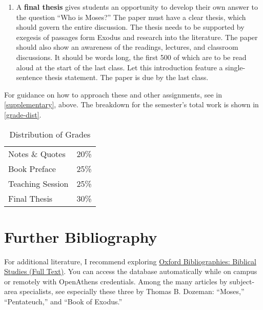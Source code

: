\documentclass[titlepage]{article}
\newcommand\policy{../policy}
\begin{document}
\begin{enumerate}
	\item A \textbf{final thesis} gives students an opportunity to
	develop their own answer to the question “Who is Moses?” The paper
	must have a clear thesis, which should govern the entire discussion.
	The thesis needs to be supported by exegesis of passages form Exodus
	and research into the literature. The paper should also show an
	awareness of the readings, lectures, and classroom discussions. It
	should be  words long, the first 500 of which are
	to be read aloud at the start of the last class. Let this
	introduction feature a single-sentence thesis statement. The paper
	is due by the last class.

\end{enumerate}

For guidance on how to approach these and other assignments, see
\cite{rlgs} in \autoref{supplementary}, above. The breakdown for the
semester's total work is shown in \autoref{grade-dist}.

\begin{table}[htbp]
  \centering
  {\lining
  \begin{tabular}{lr}
    \toprule
    Notes \& Quotes  & 20\% \\
    Book Preface     & 25\% \\
    Teaching Session & 25\% \\
    Final Thesis     & 30\% \\
    \bottomrule
  \end{tabular}}
  \caption{Distribution of Grades}
  \label{grade-dist}
\end{table}




\section{Further Bibliography}
\label{bibliography}

For additional literature, I recommend exploring \href{https://go.openathens.net/redirector/astheology.ns.ca?url=https://www.oxfordbibliographies.com/obo/page/biblical-studies}{Oxford Bibliographies: Biblical Studies (Full Text)}.
You can access the database automatically while on campus or remotely
with OpenAthens credentials. Among the many articles by subject-area
specialists, see especially these three by Thomas B. Dozeman: “Moses,”
“Pentateuch,” and “Book of Exodus.”
\end{document}
